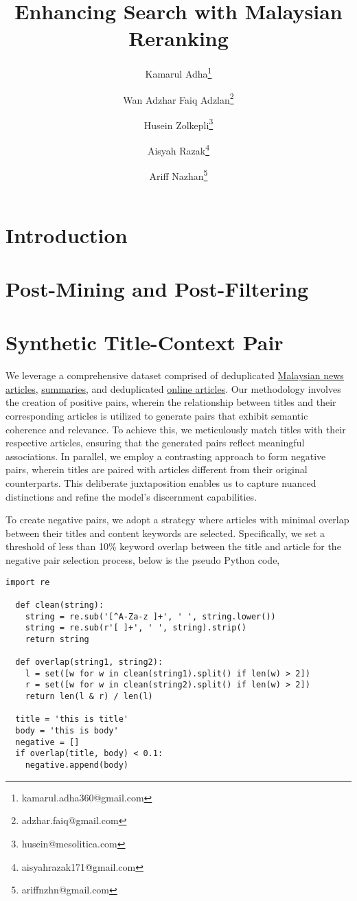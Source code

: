 \documentclass[preprint]{article}
\title{Enhancing Search with Malaysian Reranking}
\author{
  Kamarul Adha\thanks{kamarul.adha360@gmail.com} \and
  Wan Adzhar Faiq Adzlan\thanks{adzhar.faiq@gmail.com} \and
  Husein Zolkepli\thanks{husein@mesolitica.com} \and
  Aisyah Razak\thanks{aisyahrazak171@gmail.com} \and
  Ariff Nazhan\thanks{ariffnzhn@gmail.com}
}
\begin{document}
\maketitle

\begin{abstract}


\end{abstract}

\section{Introduction}

\section{Post-Mining and Post-Filtering}

\section{Synthetic Title-Context Pair}

We leverage a comprehensive dataset comprised of deduplicated \href{https://huggingface.co/datasets/malaysia-ai/dedup-text-dataset}{Malaysian news articles}, \href{https://huggingface.co/datasets/mesolitica/mixtral-malaysian-abstractive-summarization}{summaries}, and deduplicated \href{https://huggingface.co/datasets/malaysia-ai/dedup-text-dataset}{online articles}. Our methodology involves the creation of positive pairs, wherein the relationship between titles and their corresponding articles is utilized to generate pairs that exhibit semantic coherence and relevance. To achieve this, we meticulously match titles with their respective articles, ensuring that the generated pairs reflect meaningful associations. In parallel, we employ a contrasting approach to form negative pairs, wherein titles are paired with articles different from their original counterparts. This deliberate juxtaposition enables us to capture nuanced distinctions and refine the model's discernment capabilities.

To create negative pairs, we adopt a strategy where articles with minimal overlap between their titles and content keywords are selected. Specifically, we set a threshold of less than 10\% keyword overlap between the title and article for the negative pair selection process, below is the pseudo Python code,

\begin{lstlisting}[breaklines=true]
  import re

  def clean(string):
    string = re.sub('[^A-Za-z ]+', ' ', string.lower())
    string = re.sub(r'[ ]+', ' ', string).strip()
    return string

  def overlap(string1, string2):
    l = set([w for w in clean(string1).split() if len(w) > 2])
    r = set([w for w in clean(string2).split() if len(w) > 2])
    return len(l & r) / len(l)

  title = 'this is title'
  body = 'this is body'
  negative = []
  if overlap(title, body) < 0.1:
    negative.append(body)
\end{lstlisting}
\end{document}
